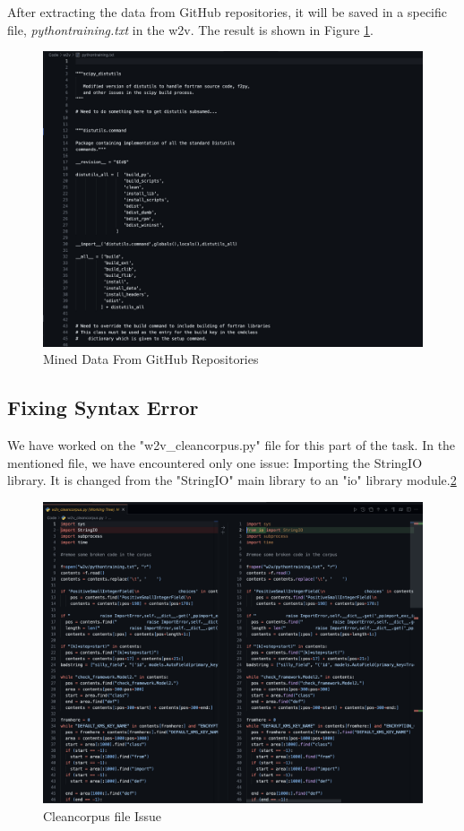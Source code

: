 After extracting the data from GitHub repositories, it will be saved in a specific file, \textit{pythontraining.txt} in the w2v. The result is shown in Figure \ref{fig: Figure1}.

\begin{figure}[!ht]
    \centering
    \includegraphics[width=1\linewidth]{pictures/py_training.png}
    \caption{Mined Data From GitHub Repositories}
    \label{fig: Figure1}
\end{figure}

\subsection{\textbf{Fixing Syntax Error}}
We have worked on the "w2v\_cleancorpus.py" file for this part of the task. 
In the mentioned file, we have encountered only one issue: Importing the StringIO library. It is changed from the "StringIO" main library to an "io" library module.\ref{fig: Figure2} 
\begin{figure}[!ht]
    \centering
    \includegraphics[width=1\linewidth]{pictures/cleancorpus_error.png}
    \caption{Cleancorpus file Issue}
    \label{fig: Figure2}
\end{figure}

